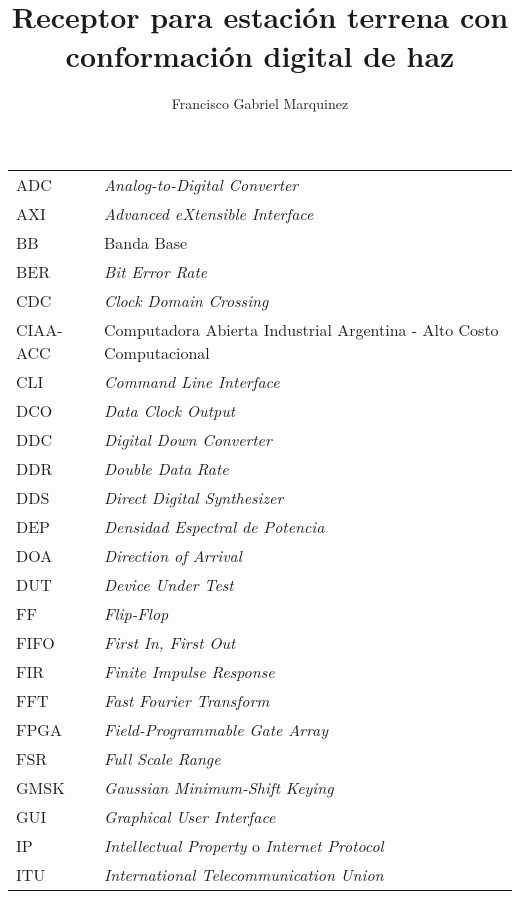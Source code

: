 \documentclass[screen, pagebackref,oneside]{ibtesis}
\title{Receptor para estación terrena con conformación digital de haz}
\author{Francisco Gabriel Marquinez}
\begin{document}
\begin{preliminary}


    \begin{abreviaturas}
        \begin{longtable}{ll}
            ADC &   \textit{Analog-to-Digital Converter} \\
            AXI &   \textit{Advanced eXtensible Interface}  \\
            BB  &   Banda Base  \\
            BER &   \textit{Bit Error Rate} \\
            CDC &   \textit{Clock Domain Crossing}  \\
            CIAA-ACC & Computadora Abierta Industrial Argentina - Alto Costo Computacional  \\
            CLI &   \textit{Command Line Interface} \\  
            DCO &   \textit{Data Clock Output}  \\
            DDC &   \textit{Digital Down Converter} \\
            DDR &   \textit{Double Data Rate}   \\
            DDS &   \textit{Direct Digital Synthesizer} \\
            DEP &   \textit{Densidad Espectral de Potencia} \\   
            DOA &   \textit{Direction of Arrival}   \\
            DUT &   \textit{Device Under Test}  \\
            FF  &   \textit{Flip-Flop}  \\
            FIFO &  \textit{First In, First Out}    \\
            FIR &   \textit{Finite Impulse Response}    \\
            FFT &   \textit{Fast Fourier Transform} \\
            FPGA &  \textit{Field-Programmable Gate Array} \\
            FSR &   \textit{Full Scale Range}   \\
            GMSK &  \textit{Gaussian Minimum-Shift Keying} \\
            GUI &   \textit{Graphical User Interface}   \\
            IP &    \textit{Intellectual Property} o \textit{Internet Protocol} \\
            ITU &   \textit{International Telecommunication Union} \\

\end{longtable}
\end{abreviaturas}
\end{preliminary}
\end{document}

